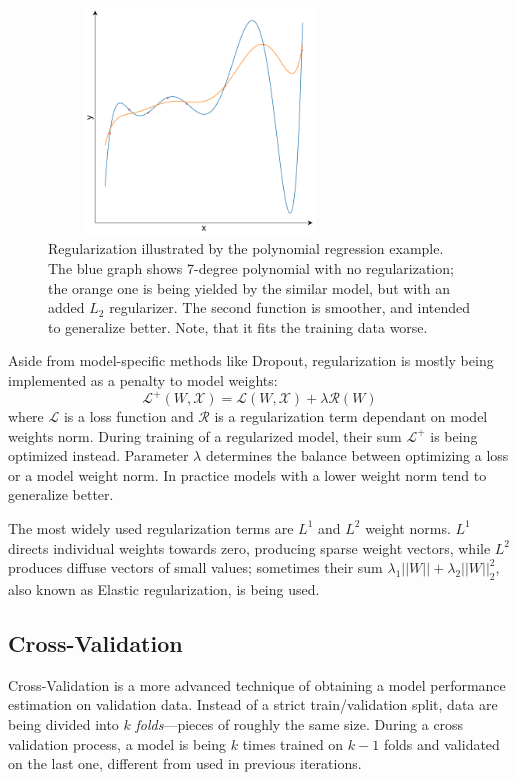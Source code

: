 \documentclass[thesis=B,english]{FITthesis}[2019/12/23]
\begin{document}
\begin{figure}[h]
	\includegraphics[width=8cm, height = 6cm]{images/regularization.png}
	\centering
	\caption{Regularization illustrated by the polynomial regression example. The blue graph shows 7-degree polynomial with no regularization; the orange one is being yielded by the similar model, but with an added $L_2$ regularizer. The second function is smoother, and intended to generalize better. Note, that it fits the training data worse.}
\end{figure}

Aside from model-specific methods like Dropout, regularization is mostly being implemented as a penalty to model weights:
\[\mathcal{L}^+(W, \mathcal{X}) = \mathcal{L}(W, \mathcal{X}) + \lambda \mathcal{R}(W) \]
where $ \mathcal{L} $ is a loss function and $ \mathcal{R} $ is a regularization term dependant on model weights norm. During training of a regularized model, their sum $\mathcal{L}^+$ is being optimized instead. Parameter $\lambda$ determines the balance between optimizing a loss or a model weight norm. In practice models with a lower weight norm tend to generalize better.

The most widely used regularization terms are $L^1$ and $L^2$ weight norms. $L^1$ directs individual weights towards zero, producing sparse weight vectors, while $L^2$ produces diffuse vectors of small values; sometimes their sum $\lambda_1||W|| + \lambda_2||W||_2^2$, also known as Elastic regularization, is being used.


\subsection{Cross-Validation}

Cross-Validation is a more advanced technique of obtaining a model performance estimation on validation data. Instead of a strict train/validation split, data are being divided into $k$ \textit{folds}---pieces of roughly the same size. During a cross validation process, a model is being $k$ times trained on $k-1$ folds and validated on the last one, different from used in previous iterations.
\end{document}
